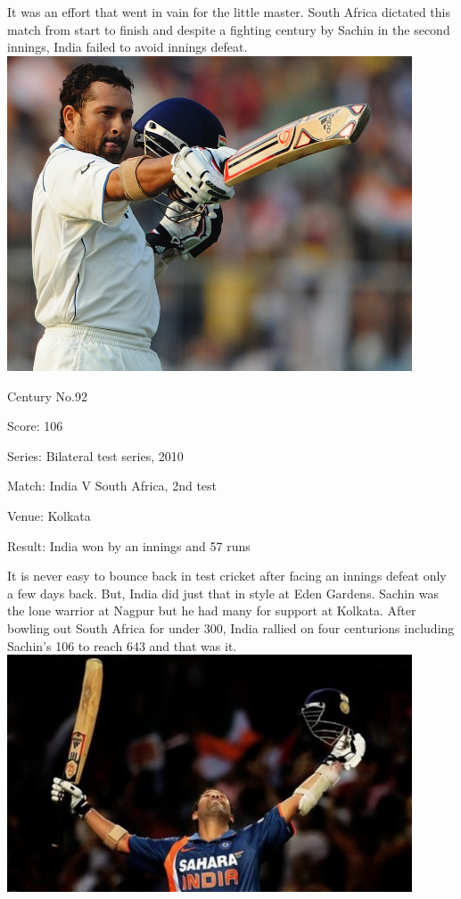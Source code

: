 \documentclass[11pt, a4paper]{article}
\begin{document}
It was an effort that went in vain for the little master. South Africa dictated this match from start to finish and despite a fighting century by Sachin in the second innings, India failed to avoid innings defeat. 
\newpage
\includegraphics[width=0.9\textwidth]{pics/92.jpg}

Century No.92 

Score: 106 

Series: Bilateral test series, 2010 

Match: India V South Africa, 2nd test 

Venue: Kolkata 

Result: India won by an innings and 57 runs 

It is never easy to bounce back in test cricket after facing an innings defeat only a few days back. But, India did just that in style at Eden Gardens. Sachin was the lone warrior at Nagpur but he had many for support at Kolkata. After bowling out South Africa for under 300, India rallied on four centurions including Sachin's 106 to reach 643 and that was it.
\newpage
\includegraphics[width=0.9\textwidth]{pics/93.jpg}
\end{document}
